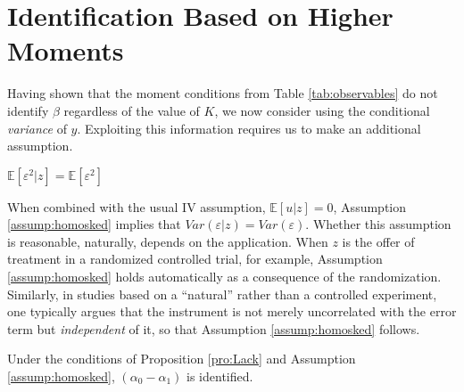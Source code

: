 \section{Identification Based on Higher Moments}
Having shown that the moment conditions from Table \ref{tab:observables} do not identify $\beta$ regardless of the value of $K$, we now consider using the conditional \emph{variance} of $y$.
Exploiting this information requires us to make an additional assumption.
\begin{assump}[Homoskedasticity]
  $\mathbb{E}[\varepsilon^2|z]=\mathbb{E}[\varepsilon^2]$
  \label{assump:homosked}
\end{assump}
When combined with the usual IV assumption, $\mathbb{E}[u|z]=0$, Assumption \ref{assump:homosked} implies that $Var(\varepsilon|z) = Var(\varepsilon)$.
Whether this assumption is reasonable, naturally, depends on the application.
When $z$ is the offer of treatment in a randomized controlled trial, for example, Assumption \ref{assump:homosked} holds automatically as a consequence of the randomization.
Similarly, in studies based on a ``natural'' rather than a controlled experiment, one typically argues that the instrument is not merely uncorrelated with the error term but \emph{independent} of it, so that Assumption \ref{assump:homosked} follows.
\begin{pro}
  \label{pro:homosked}
  Under the conditions of Proposition \ref{pro:Lack} and Assumption \ref{assump:homosked}, $(\alpha_0 - \alpha_1)$ is identified. 
\end{pro}
